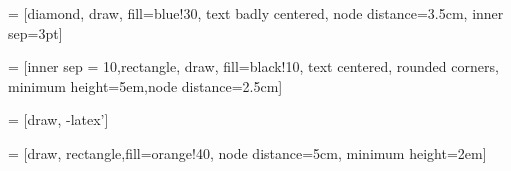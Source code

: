 
\usetikzlibrary{shapes,arrows}

\newcommand{\hoo}[0]{H_2O}

 = [diamond, draw, fill=blue!30, text badly centered, node distance=3.5cm, inner sep=3pt]
    
 = [inner sep = 10,rectangle, draw, fill=black!10, text centered, rounded corners, minimum height=5em,node distance=2.5cm]
    
 = [draw, -latex']

 = [draw, rectangle,fill=orange!40, node distance=5cm,
    minimum height=2em]

\begin{tikzpicture}




\end{tikzpicture}
